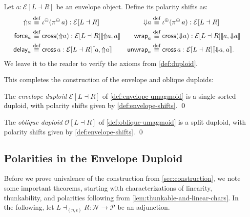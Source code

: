 \documentclass[runningheads]{llncs}
\newcommand*\rocqlogo{\usebox{\rocqlogobox}}
\newcommand{\lemmaref}[3]{\href{https://github.com/UniMath/UniMath/blob/94fae0eda57a778cec704bfa73b4ff525c9bc475/#1\#L#2?name=#3}{\rocqlogo}}
\newcommand{\acat}[1]{\mathcal{#1}}
\newcommand{\PP}{\acat{P}}
\newcommand{\NN}{\acat{N}}
\newcommand{\OO}{\acat{O}}
\newcommand{\EE}{\acat{E}}
\newcommand{\Obl}[1]{\OO[#1]}
\newcommand{\Env}[1]{\EE[#1]}
\newcommand{\morsof}[3]{{#1}\llbracket{#2},{#3}\rrbracket}
\newcommand{\defequiv}{\overset{\mathrm{\textup{def}}}{\equiv}}
\newcommand{\force}{\mathop{\mathsf{force}}\nolimits}
\newcommand{\delay}{\mathop{\mathsf{delay}}\nolimits}
\newcommand{\wrap}{\mathop{\mathsf{wrap}}\nolimits}
\newcommand{\unwrap}{\mathop{\mathsf{unwrap}}\nolimits}
\newcommand{\upshift}{\mathord{\Uparrow}}
\newcommand{\downshift}{\mathord{\Downarrow}}
\newcommand{\inneg}{\mathop{\iota^{\ominus}}}
\newcommand{\inpos}{\mathop{\iota^{\oplus}}}
\newcommand{\projneg}{\mathop{\pi^{\ominus}}}
\newcommand{\projpos}{\mathop{\pi^{\oplus}}}
\newcommand{\crossmor}{\mathop{\mathsf{cross}}}
\begin{document}
\begin{definition}[{\lemmaref{UniMath/CategoryTheory/Nonassociative/Duploids/FromAdjunction/Envelope.v}{477}{envelope\_upshift}}]
\label{def:envelope-shifts}
Let \(a : \Env{L \dashv R}\) be an envelope object. Define its
polarity shifts as:
\begin{align*}
\upshift{a} &\defequiv \inneg(\projneg a) : \Env{L \dashv R}
 & \downshift{a} &\defequiv \inpos(\projpos a) : \Env{L \dashv R} \\
\force_a &\defequiv \crossmor(\upshift{a}) : \morsof{\Env{L \dashv R}}{\upshift{a}}{a}
 & \wrap_a &\defequiv \crossmor(\downshift{a}) : \morsof{\Env{L \dashv R}}{a}{\downshift{a}} \\
\delay_a &\defequiv \crossmor{a} : \morsof{\Env{L \dashv R}}{a}{\upshift{a}}
 & \unwrap_a &\defequiv \crossmor{a} : \morsof{\Env{L \dashv R}}{\downshift{a}}{a}\mathpunct.
\end{align*}
We leave it to the reader to verify the axioms from \autoref{def:duploid}.
\end{definition}

This completes the construction of the envelope and oblique duploids:

\begin{theorem}[{\lemmaref{UniMath/CategoryTheory/Nonassociative/Duploids/FromAdjunction/Envelope.v}{672}{envelope\_duploid}}]
The \emph{envelope duploid} \(\Env{L \dashv R}\) of
\autoref{def:envelope-umagmoid} is a single\hyp{}sorted duploid, with polarity shifts
given by \autoref{def:envelope-shifts}.
\qed
\end{theorem}

\begin{theorem}[{\lemmaref{UniMath/CategoryTheory/Nonassociative/Duploids/FromAdjunction/Oblique.v}{269}{oblique\_duploid}}]
The \emph{oblique duploid} \(\Obl{L \dashv R}\) of
\autoref{def:oblique-umagmoid} is a split duploid, with polarity shifts given by
\autoref{def:envelope-shifts}.
\qed
\end{theorem}
\subsection{Polarities in the Envelope Duploid}
\label{sec:polarities-in-the-envelope-duploid}
Before we prove univalence of the construction from \autoref{sec:construction}, we
note some important theorems, starting with characterizations of
linearity, thunkability, and polarities following from
\autoref{lem:thunkable-and-linear-chars}. In the following, let \(L
\dashv_{(\eta,\epsilon)} R : \NN \to \PP\) be an adjunction.
\end{document}
